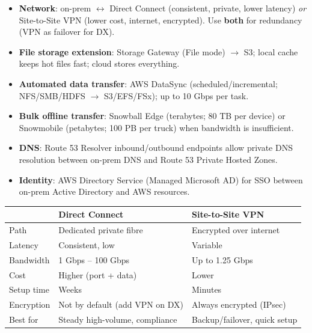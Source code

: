 \begin{keyfacts}
\begin{itemize}
  \item \textbf{Network}: on-prem $\leftrightarrow$ Direct Connect (consistent, private,
        lower latency) \emph{or} Site-to-Site VPN (lower cost, internet, encrypted).
        Use \textbf{both} for redundancy (VPN as failover for DX).
  \item \textbf{File storage extension}: Storage Gateway (File mode) $\to$ S3; local cache
        keeps hot files fast; cloud stores everything.
  \item \textbf{Automated data transfer}: AWS DataSync (scheduled/incremental; NFS/SMB/HDFS
        $\to$ S3/EFS/FSx); up to 10 Gbps per task.
  \item \textbf{Bulk offline transfer}: Snowball Edge (terabytes; 80 TB per device) or
        Snowmobile (petabytes; 100 PB per truck) when bandwidth is insufficient.
  \item \textbf{DNS}: Route 53 Resolver inbound/outbound endpoints allow private DNS
        resolution between on-prem DNS and Route 53 Private Hosted Zones.
  \item \textbf{Identity}: AWS Directory Service (Managed Microsoft AD) for SSO between
        on-prem Active Directory and AWS resources.
\end{itemize}
\end{keyfacts}

\begin{comparebox}[title={Direct Connect vs VPN}]
\begin{tabular}{@{}p{3.5cm}p{4.5cm}p{3.5cm}@{}}
\toprule
 & \textbf{Direct Connect} & \textbf{Site-to-Site VPN} \\
\midrule
Path       & Dedicated private fibre              & Encrypted over internet \\
Latency    & Consistent, low                      & Variable \\
Bandwidth  & 1 Gbps -- 100 Gbps                   & Up to 1.25 Gbps \\
Cost       & Higher (port + data)                 & Lower \\
Setup time & Weeks                                & Minutes \\
Encryption & Not by default (add VPN on DX)       & Always encrypted (IPsec) \\
Best for   & Steady high-volume, compliance       & Backup/failover, quick setup \\
\bottomrule
\end{tabular}
\end{comparebox}

